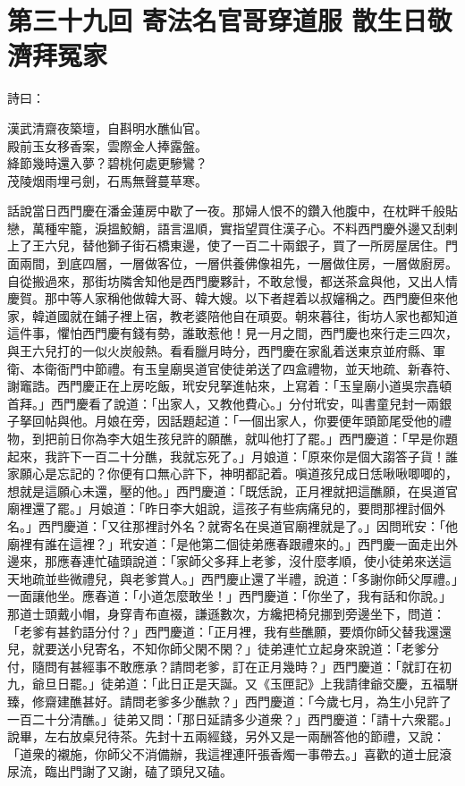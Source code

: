 
\chapter*{第三十九回 寄法名官哥穿道服 散生日敬濟拜冤家}


詩曰：

\begin{myquote}
漢武清齋夜築壇，自斟明水醮仙官。\\殿前玉女移香案，雲際金人捧露盤。\\絳節幾時還入夢？碧桃何處更驂鸞？\\茂陵烟雨埋弓劍，石馬無聲蔓草寒。
\end{myquote}

話說當日西門慶在潘金蓮房中歇了一夜。那婦人恨不的鑽入他腹中，在枕畔千般貼戀，萬種牢籠，淚搵鮫鮹，語言溫順，實指望買住漢子心。不料西門慶外邊又刮剌上了王六兒，替他獅子街石橋東邊，使了一百二十兩銀子，買了一所房屋居住。門面兩間，到底四層，一層做客位，一層供養佛像祖先，一層做住房，一層做廚房。自從搬過來，那街坊隣舍知他是西門慶夥計，不敢怠慢，都送茶盒與他，又出人情慶賀。那中等人家稱他做韓大哥、韓大嫂。以下者趕着以叔嬸稱之。西門慶但來他家，韓道國就在鋪子裡上宿，教老婆陪他自在頑耍。朝來暮往，街坊人家也都知道這件事，懼怕西門慶有錢有勢，誰敢惹他！見一月之間，西門慶也來行走三四次，與王六兒打的一似火炭般熱。看看臘月時分，西門慶在家亂着送東京並府縣、軍衛、本衛衙門中節禮。有玉皇廟吳道官使徒弟送了四盒禮物，並天地疏、新春符、謝竈誥。西門慶正在上房吃飯，玳安兒拏進帖來，上寫着：「玉皇廟小道吳宗嚞頓首拜。」西門慶看了說道：「出家人，又教他費心。」分付玳安，叫書童兒封一兩銀子拏回帖與他。月娘在旁，因話題起道：「一個出家人，你要便年頭節尾受他的禮物，到把前日你為李大姐生孩兒許的願醮，就叫他打了罷。」西門慶道：「早是你題起來，我許下一百二十分醮，我就忘死了。」月娘道：「原來你是個大謅答子貨！誰家願心是忘記的？你便有口無心許下，神明都記着。嗔道孩兒成日恁啾啾唧唧的，想就是這願心未還，壓的他。」{}西門慶道：「既恁說，正月裡就把這醮願，在吳道官廟裡還了罷。」月娘道：「昨日李大姐說，這孩子有些病痛兒的，要問那裡討個外名。」西門慶道：「又往那裡討外名？就寄名在吳道官廟裡就是了。」因問玳安：「他廟裡有誰在這裡？」玳安道：「是他第二個徒弟應春跟禮來的。」西門慶一面走出外邊來，那應春連忙磕頭說道：「家師父多拜上老爹，沒什麼孝順，使小徒弟來送這天地疏並些微禮兒，與老爹賞人。」西門慶止還了半禮，說道：「多謝你師父厚禮。」一面讓他坐。應春道：「小道怎麼敢坐！」西門慶道：「你坐了，我有話和你說。」那道士頭戴小帽，身穿青布直裰，謙遜數次，方纔把椅兒挪到旁邊坐下，問道：「老爹有甚釣語分付？」西門慶道：「正月裡，我有些醮願，要煩你師父替我還還兒，就要送小兒寄名，不知你師父閑不閑？」徒弟連忙立起身來說道：「老爹分付，隨問有甚經事不敢應承？請問老爹，訂在正月幾時？」西門慶道：「就訂在初九，爺旦日罷。」徒弟道：「此日正是天誕。又《玉匣記》上我請律爺交慶，五福駢臻，修齋建醮甚好。請問老爹多少醮款？」西門慶道：「今歲七月，為生小兒許了一百二十分清醮。」徒弟又問：「那日延請多少道衆？」西門慶道：「請十六衆罷。」說畢，左右放桌兒待茶。先封十五兩經錢，另外又是一兩酬答他的節禮，又說：「道衆的襯施，你師父不消備辦，我這裡連阡張香燭一事帶去。」喜歡的道士屁滾尿流，臨出門謝了又謝，磕了頭兒又磕。

